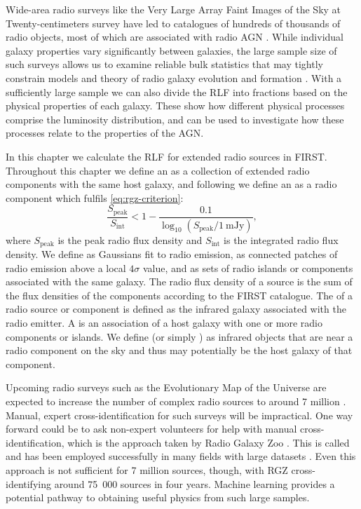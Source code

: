 Wide-area radio surveys like the Very Large Array Faint Images of the Sky at
Twenty-centimeters survey \citep[FIRST;][]{white97first} have led to
catalogues of hundreds of thousands of radio objects, most of which are
associated with radio AGN \citep{sadler02rlf}. While individual galaxy
properties vary significantly between galaxies, the large sample size of
such surveys allows us to examine reliable bulk statistics that may
tightly constrain models and theory of radio galaxy evolution and formation \citep{condon92radio}. With a
sufficiently large sample \citep[of size $N$ such that $N \gg
\sqrt{N}$;][]{condon91rlf} we can also divide the RLF into fractions based
on the physical properties of each galaxy. These  show
how different physical processes comprise the luminosity distribution, and
can be used to investigate how these processes relate to the properties of
the AGN.

In this chapter we calculate the RLF for extended radio sources in FIRST. Throughout this chapter we define an  as a collection of extended radio components with the same host galaxy, and following
\citet{banfield15} we define an  as a radio
component which fulfils \autoref{eq:rgz-criterion}:
\begin{equation}
    \frac{S_{\mathrm{peak}}}{S_{\mathrm{int}}} < 1 - \frac{0.1}{\log_{10}(S_{\mathrm{peak}} / 1\ \mathrm{mJy})},
    \label{eq:rgz-criterion}
\end{equation}
where $S_{\mathrm{peak}}$ is the peak radio flux density and
$S_{\mathrm{int}}$ is the integrated radio flux density. We define  as Gaussians fit to
radio emission,  as connected patches of radio emission
above a local $4\sigma$ value, and  as sets of radio
islands or components associated with the same galaxy. The radio flux density of a source is the sum of the flux densities of the components according to the FIRST catalogue. The  of a radio source or component is defined as the infrared galaxy
associated with the radio emitter. A  is an
association of a host galaxy with one or more radio components or islands. We
define  (or simply
) as infrared objects that are near a radio component on
the sky and thus may potentially be the host galaxy of that component.

Upcoming
radio surveys such as the Evolutionary Map of the Universe
\citep[EMU;][]{norris11} are expected to increase the number
of complex radio sources to around 7 million \citep{banfield15}. Manual, expert cross-identification for such surveys will be impractical. One way forward could be to ask non-expert volunteers for help with manual cross-identification, which is the approach taken by Radio Galaxy Zoo \citep[RGZ;][]{banfield15}. This is called  and has been employed successfully in many fields with large datasets \citep{marshall15citizen}. Even this approach is not sufficient for 7 million sources, though, with RGZ cross-identifying around 75~000 sources in four years. Machine
learning provides a potential pathway to obtaining useful physics from such
large samples.

